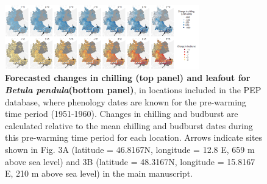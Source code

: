 \documentclass{article}
\begin{document}
\begin{figure}[h!]
\centering
\noindent \includegraphics[width=0.75\textwidth]{..//..//analyses/bb_analysis/figures/forecasting/heatmapsbetpepfinalarrows.png}
\caption{\textbf{Forecasted changes in chilling (top panel) and leafout for \emph{Betula pendula}(bottom panel)}, in locations included in the PEP database, where phenology dates are known for the pre-warming time period (1951-1960). Changes in chilling and budburst are calculated relative to the mean chilling and budburst dates during this pre-warming time period for each location. Arrows indicate sites shown in Fig. 3A (latitude = 46.8167\degree N, longitude =  12.8 \degree E, 659 m above sea level) and 3B (latitude = 48.3167\degree N, longitude =  15.8167 \degree E, 210 m above sea level) in the main manuscript.} 

\label{fig:foremap}
\end{figure}
\end{document}
